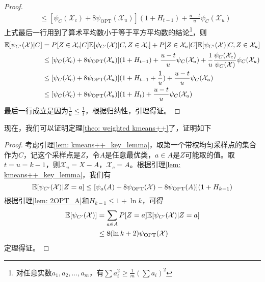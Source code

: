 \begin{proof}
\begin{align}
            &\leq [\psi_{C}(\mathcal{X}_c)+8\psi_{\text{OPT}}(\mathcal{X}_u)](1+H_{t-1}) + \frac{u-t}{u} \psi_C(\mathcal{X}_u)
    \end{align}
    上式最后一行用到了算术平均数小于等于平方平均数的结论\footnote{对任意实数$a_1,a_2,...,a_m$，有$\sum a_i^2 \geq \frac{1}{m}(\sum a_i)^2$}，则
    \begin{align}
        \mathbb{E}[\psi_{C'}(\mathcal{X})|C] &= P[Z \in \mathcal{X}_c|C] \mathbb{E}[\psi_{C'}(\mathcal{X})|C,Z \in \mathcal{X}_c] + P[Z \in \mathcal{X}_u|C] \mathbb{E}[\psi_{C'}(\mathcal{X})|C,Z \in \mathcal{X}_u] \\
            &\leq [\psi_{C}(\mathcal{X}_c)+8\psi_{\text{OPT}}(\mathcal{X}_u)](1+H_{t-1}) + \frac{u-t}{u}\psi_C(\mathcal{X}_u) + \frac{1}{u} \frac{\psi_C(\mathcal{X}_c)}{\psi_C(\mathcal{X})} \psi_C(\mathcal{X}_u) \\
            &\leq [\psi_{C}(\mathcal{X}_c)+8\psi_{\text{OPT}}(\mathcal{X}_u)](1+H_{t-1}+\frac{1}{u}) + \frac{u-t}{u}\psi_C(\mathcal{X}_u) \\
            &\leq [\psi_{C}(\mathcal{X}_c)+8\psi_{\text{OPT}}(\mathcal{X}_u)](1+H_{t}) + \frac{u-t}{u}\psi_C(\mathcal{X}_u)
    \end{align}
    最后一行成立是因为$\frac{1}{u} \leq \frac{1}{t}$，根据归纳性，引理得证。
\end{proof}
现在，我们可以证明定理\ref{theo: weighted kmeans++}了，证明如下
\begin{proof}
    考虑引理\ref{lem: kmeans++_key_lemma}，取第一个带权均匀采样点的集合作为$C$，记这个采样点是$Z$，令$A$是任意最优类，$a\in A$是$Z$可能取的值。取$t=u=k-1$，则$\mathcal{X}_u = X - A$，$\mathcal{X}_c = A$。根据引理\ref{lem: kmeans++_key_lemma}，我们有
    \begin{equation}
        \mathbb{E}[\psi_{C'}(\mathcal{X})|Z=a] \leq [\psi_a(A)+8\psi_{\text{OPT}}(\mathcal{X})-8\psi_{\text{OPT}}(A)](1+H_{k-1})
    \end{equation}
    根据引理\ref{lem: 2OPT_A}和$H_{k-1} \leq 1 + \ln k$，可得
    \begin{align}
        \mathbb{E}[\psi_{C'}(\mathcal{X})] &= \sum_{a \in A} P[Z=a] \mathbb{E}[\psi_{C'}(\mathcal{X})|Z=a] \\
        &\leq 8(\ln k +2)\psi_{\text{OPT}}(\mathcal{X})
    \end{align}
    定理得证。
\end{proof}